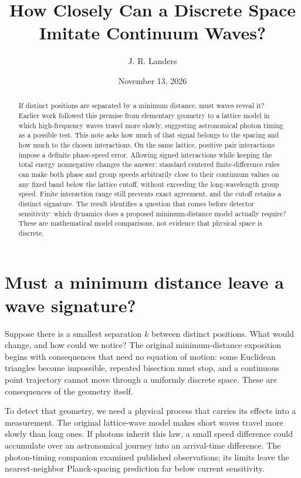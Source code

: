 \documentclass[11pt]{article}
\title{How Closely Can a Discrete Space\\Imitate Continuum Waves?}
\author{J. R. Landers}
\date{November 13, 2026}
\begin{document}
\maketitle
\begin{abstract}
If distinct positions are separated by a minimum distance, must waves reveal it? Earlier work followed this premise from elementary geometry to a lattice model in which high-frequency waves travel more slowly, suggesting astronomical photon timing as a possible test. This note asks how much of that signal belongs to the spacing and how much to the chosen interactions. On the same lattice, positive pair interactions impose a definite phase-speed error. Allowing signed interactions while keeping the total energy nonnegative changes the answer: standard centered finite-difference rules can make both phase and group speeds arbitrarily close to their continuum values on any fixed band below the lattice cutoff, without exceeding the long-wavelength group speed. Finite interaction range still prevents exact agreement, and the cutoff retains a distinct signature. The result identifies a question that comes before detector sensitivity: which dynamics does a proposed minimum-distance model actually require? These are mathematical model comparisons, not evidence that physical space is discrete.
\end{abstract}

\section{Must a minimum distance leave a wave signature?}
Suppose there is a smallest separation $k$ between distinct positions. What would change, and how could we notice? The original minimum-distance exposition \cite{minimum} begins with consequences that need no equation of motion: some Euclidean triangles become impossible, repeated bisection must stop, and a continuous point trajectory cannot move through a uniformly discrete space. These are consequences of the geometry itself.

To detect that geometry, we need a physical process that carries its effects into a measurement. The original lattice-wave model makes short waves travel more slowly than long ones. If photons inherit this law, a small speed difference could accumulate over an astronomical journey into an arrival-time difference. The photon-timing companion \cite{timing} examined published observations; its limits leave the nearest-neighbor Planck-spacing prediction far below current sensitivity.
\end{document}

